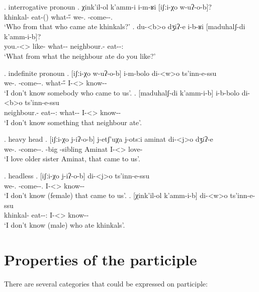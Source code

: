 \ex. interrogative pronoun
	\ag. χink'il-ol k'amm-i i-m-ʁi [iʃːi-χo w-uʔ-o-b]?\\
			{khinkal-\Pl} {eat-\Pst(\Aor)} {what-\H-\Wh} {we-\Add.\Lat} {\M-come-\Pst-\Ptcp.\Pst}\\
			\glt `Who from that who came ate khinkals?'
	\bg. du-<b>o dʒiʔ-e i-b-ʁi [maduhalʃ-di k'amm-i-b]?\\
			{you.\Obl-<\Nanf>\Aff} {like-\Hab} {what-\Nh-\Wh} {neighbour.\Obl-\Erg} {eat-\Pst-\Ptcp:\Pst}\\
			\glt `What from what the neighbour ate do you like?'
		
\ex. indefinite pronoun
	\ag.  [iʃːi-χo w-uʔ-o-b] i-m-bolo di-<w>o  ts'inn-e-ssu\\
			{we-\Add.\Lat} {\M-come-\Pst-\Ptcp.\Pst} {what-\H-\Indef} {I-<\M>\Aff} {know-\Hab-\Neg}\\
			\glt `I don't know somebody who came to us'.
	\bg.  [maduhalʃ-di k'amm-i-b] i-b-bolo di-<b>o  ts'inn-e-ssu\\
			{neighbour.\Obl-\Erg} {eat-\Pst-\Ptcp:\Pst} {what-\Nh-\Indef} {I-<\Nanf>\Aff} {know-\Hab-\Neg}\\
			\glt `I don't know something that neighbour ate'.

\ex. heavy head
	\ag.  [iʃːi-χo j-iʔ-o-b] j-etʃ'uχa j-otsːi aminat di-<j>o dʒiʔ-e\\
			{we-\Add.\Lat} {\F-come-\Pst-\Ptcp.\Pst} {\F-big} {\F-sibling} Aminat {I-<\F>\Aff} {love-\Hab}\\
			\glt `I love older sister Aminat, that came to us'.

\ex. headless
	\ag.  [iʃːi-χo j-iʔ-o-b] di-<j>o ts'inn-e-ssu\\
			{we-\Add.\Lat} {\F-come-\Pst-\Ptcp.\Pst} {I-<\F>\Aff} {know-\Hab-\Neg}\\
			\glt `I don't know (female) that came to us'.
	\bg.  [χink'il-ol k'amm-i-b] di-<w>o ts'inn-e-ssu\\
			{khinkal-\Pl} {eat-\Pst-\Ptcp:\Pst} {I-<\M>\Aff} {know-\Hab-\Neg}\\
			\glt `I don't know (male) who ate khinkals'.

\pagebreak

\section{Properties of the participle}
There are several categories that could be expressed on participle:

